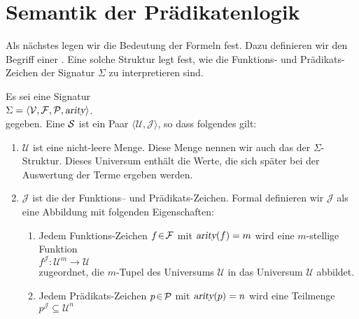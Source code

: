 \section{Semantik der Prädikatenlogik \label{sec:semantik}}
Als nächstes legen wir die Bedeutung der Formeln fest.  Dazu definieren wir 
den Begriff einer .   Eine solche Struktur legt fest, wie die
Funktions- und Prädikats-Zeichen der Signatur $\Sigma$ zu interpretieren sind.

\begin{Definition}[Struktur]
    Es sei eine  Signatur \\[0.2cm]
    \hspace*{1.3cm} $\Sigma = \langle \mathcal{V}, \mathcal{F}, \mathcal{P}, \textsl{arity} \rangle$. \\[0.2cm]
    gegeben. Eine  $\mathcal{S}$ ist ein
    Paar $\langle \mathcal{U}, \mathcal{J} \rangle$, so dass folgendes gilt:
    \begin{enumerate}
        \item $\mathcal{U}$ ist eine nicht-leere Menge. Diese Menge nennen wir auch das
                der $\Sigma$-Struktur.  Dieses Universum enthält die Werte,
              die sich später bei der Auswertung der Terme ergeben werden.
        \item $\mathcal{J}$ ist die   der Funktions-- und Prädikats-Zeichen.
              Formal definieren wir $\mathcal{J}$ als eine Abbildung mit folgenden Eigenschaften:
        \begin{enumerate}
        \item Jedem Funktions-Zeichen $f \!\in\! \mathcal{F}$ mit $\textsl{arity}(f) = m$ wird
              eine $m$-stellige Funktion \\[0.2cm]
              \hspace*{1.3cm}
              $f^\mathcal{J}\colon \mathcal{U}^m \rightarrow \mathcal{U}$ \\[0.2cm]
              zugeordnet, die $m$-Tupel des Universums $\mathcal{U}$ in das Universum $\mathcal{U}$ abbildet.
        \item Jedem Prädikats-Zeichen $p \!\in\! \mathcal{P}$ mit $\textsl{arity}(p) = n$ wird
              eine Teilmenge \\[0.2cm]
              \hspace*{1.3cm} 
              $p^\mathcal{J} \subseteq \mathcal{U}^n$ \\[0.2cm]

\end{enumerate}
\end{enumerate}
\end{Definition}

